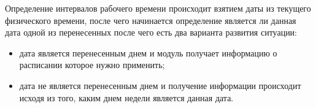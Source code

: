 \indent Определение интервалов рабочего времени происходит взятием даты из текущего физического времени, после чего начинается определение является ли данная дата одной из перенесенных после чего есть два варианта развития ситуации:

\begin{itemize}
	\item дата является перенесенным днем и модуль получает информацию о расписании которое нужно применить;
	\item дата не является перенесенным днем и получение информации происходит исходя из того, каким днем недели является данная дата.
\end{itemize}

